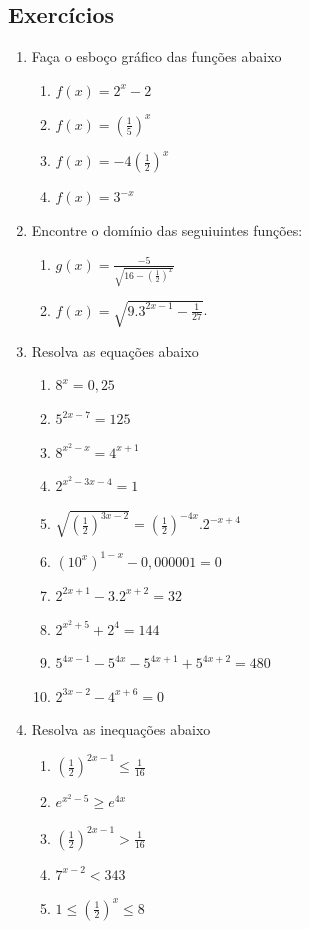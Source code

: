 \subsection{Exercícios}

\begin{enumerate}

	\item Faça o esboço gráfico das funções abaixo

	\begin{enumerate}
		\item $f(x) = 2^x-2$
		\item $f(x)=\left( \frac{1}{5}\right)^x$
		\item $f(x) =-4\left(\frac{1}{2}\right)^x$
		\item $f(x) = 3^{-x}$
	\end{enumerate}
	 \item  Encontre o domínio das seguiuintes funções:
	 \begin{enumerate}
	 \item  $g(x)=\frac{-5}{ \sqrt{16-\left( \frac{1}{2} \right)^x}}$
	     \item  $f(x)= \sqrt{9. 3^{2x-1}-\frac{1}{27}}$.
	 \end{enumerate}

	\item Resolva as equações abaixo
	\begin{enumerate}
		\item $8^{x}=0,25$
	     \item $5^{2x-7}=125$
		\item $8^{x^2-x}=4^{x+1}$
		\item $2^{x^2- 3x - 4}=1$
	\item $\sqrt{\left(\frac{1}{2}\right)^{3x-2}}=\left(\frac{1}{2}\right)^{-4x}.2^{-x+4}$
		\item $(10^x)^{1-x}-0,000001=0$
	\item $2^{2x + 1} - 3.2^{x + 2} = 32$
         \item $2^{x^2+5}+2^4=144$
         \item $5^{4x-1}-5^{4x}-5^{4x+1}+5^{4x+2}=480$
         \item $2^{3x-2}-4^{x+6}=0$
			\end{enumerate}
		\item Resolva as inequações abaixo
		\begin{enumerate}
			\item $\left(\frac{1}{2}\right)^{2x-1}\leq \frac{1}{16}$
			\item $e^{x^2-5}\geq e^{4x}$
			 \item $\left(\frac{1}{2} \right)^{2x-1}> \frac{1}{16}$
         \item $7^{x-2}<343$
         \item  $1 \leq \left( \frac{1}{2}\right)^x \leq 8$
		\end{enumerate}



\end{enumerate}
